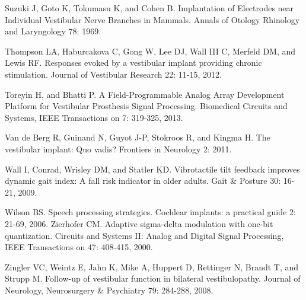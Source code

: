 {Suzuki J, Goto K, Tokumasu K, and Cohen B. Implantation of Electrodes near Individual Vestibular Nerve Branches in Mammals. Annals of Otology Rhinology and Laryngology 78: 1969.

Thompson LA, Haburcakova C, Gong W, Lee DJ, Wall III C, Merfeld DM, and Lewis RF. Responses evoked by a vestibular implant providing chronic stimulation. Journal of Vestibular Research 22: 11-15, 2012.

Toreyin H, and Bhatti P. A Field-Programmable Analog Array Development Platform for Vestibular Prosthesis Signal Processing. Biomedical Circuits and Systems, IEEE Transactions on 7: 319-325, 2013.

Van de Berg R, Guinand N, Guyot J-P, Stokroos R, and Kingma H. The vestibular implant: Quo vadis? Frontiers in Neurology 2: 2011.

Wall I, Conrad, Wrisley DM, and Statler KD. Vibrotactile tilt feedback improves dynamic gait index: A fall risk indicator in older adults. Gait \& Posture 30: 16-21, 2009.

Wilson BS. Speech processing strategies. Cochlear implants: a practical guide 2: 21-69, 2006.
Zierhofer CM. Adaptive sigma-delta modulation with one-bit quantization. Circuits and Systems II: Analog and Digital Signal Processing, IEEE Transactions on 47: 408-415, 2000.

Zingler VC, Weintz E, Jahn K, Mike A, Huppert D, Rettinger N, Brandt T, and Strupp M. Follow-up of vestibular function in bilateral vestibulopathy. Journal of Neurology, Neurosurgery \& Psychiatry 79: 284-288, 2008.
}